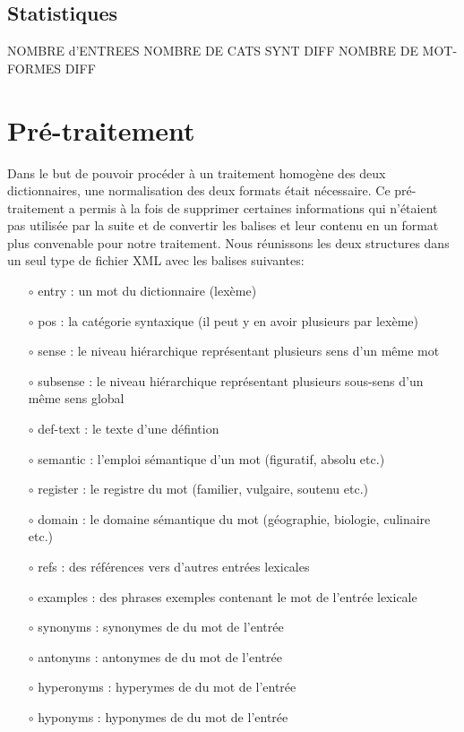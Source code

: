 \documentclass[a4paper, 12pt]{article}
\begin{document}
\subsection{Statistiques}

NOMBRE d'ENTREES
NOMBRE DE CATS SYNT DIFF
NOMBRE DE MOT-FORMES DIFF

\section{Pré-traitement}

Dans le but de pouvoir procéder à un traitement homogène des deux dictionnaires, 
une normalisation des deux formats était nécessaire. Ce pré-traitement a permis 
à la fois de supprimer certaines informations qui n'étaient pas utilisée par la 
suite et de convertir les balises et leur contenu en un format plus convenable 
pour notre traitement. Nous réunissons les deux structures dans un seul type de 
fichier XML avec les balises suivantes:

    \begin{itemize}
        \item[$\circ$] entry : un mot du dictionnaire (lexème)
        \item[$\circ$] pos : la catégorie syntaxique (il peut y en avoir 
plusieurs par lexème)
        \item[$\circ$] sense : le niveau hiérarchique représentant plusieurs 
        sens d'un même mot
        \item[$\circ$] subsense : le niveau hiérarchique représentant plusieurs 
        sous-sens d'un même sens global
        \item[$\circ$] def-text : le texte d'une défintion
        \item[$\circ$] semantic : l'emploi sémantique d'un mot (figuratif, 
        absolu etc.)
        \item[$\circ$] register : le registre du mot (familier, vulgaire, 
        soutenu etc.)
        \item[$\circ$] domain : le domaine sémantique du mot (géographie, 
        biologie, culinaire etc.)
        \item[$\circ$] refs : des références vers d'autres entrées lexicales
        \item[$\circ$] examples : des phrases exemples contenant le mot de 
        l'entrée lexicale
        \item[$\circ$] synonyms : synonymes de du mot de l'entrée
        \item[$\circ$] antonyms : antonymes de du mot de l'entrée
        \item[$\circ$] hyperonyms : hyperymes de du mot de l'entrée
        \item[$\circ$] hyponyms : hyponymes de du mot de l'entrée
    \end{itemize}
\bigskip
\end{document}
